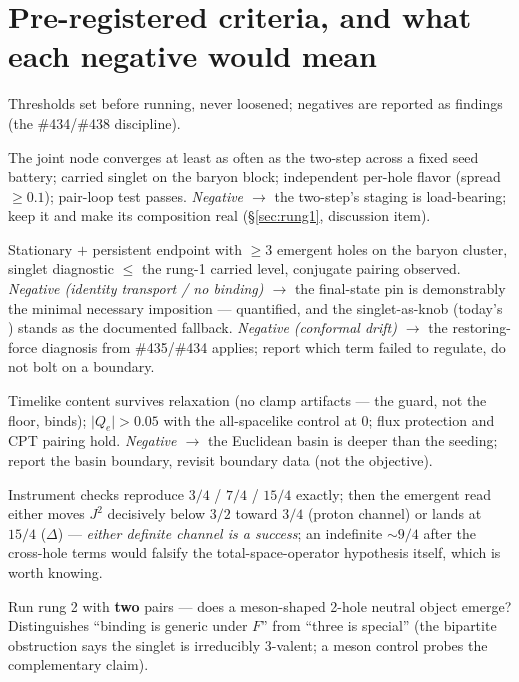 \documentclass[11pt]{article}
\newcommand{\abs}[1]{\lvert #1 \rvert}
\begin{document}
\section{Pre-registered criteria, and what each negative would mean}
\label{sec:criteria}

Thresholds set before running, never loosened; negatives are reported as findings (the
\#434/\#438 discipline).

\begin{description}[leftmargin=2em]
  \item[Rung 1.] The joint node converges at least as often as the two-step across a
    fixed seed battery; carried singlet on the baryon block; independent per-hole flavor
    (spread $\geq 0.1$); pair-loop test passes. \emph{Negative $\to$} the two-step's
    staging is load-bearing; keep it and make its composition real
    (\S\ref{sec:rung1}, discussion item).
  \item[Rung 2.] Stationary $+$ persistent endpoint with $\geq 3$ emergent holes on the
    baryon cluster, singlet diagnostic $\leq$ the rung-1 carried level, conjugate pairing
    observed. \emph{Negative (identity transport / no binding) $\to$} the final-state pin
    is demonstrably the minimal necessary imposition --- quantified, and the
    singlet-as-knob (today's ) stands as the documented fallback.
    \emph{Negative (conformal drift) $\to$} the restoring-force diagnosis from
    \#435/\#434 applies; report which term failed to regulate, do not bolt on a boundary.
  \item[Rung L.] Timelike content survives relaxation (no clamp artifacts --- the guard,
    not the floor, binds); $\abs{Q_e} > 0.05$ with the all-spacelike control at $0$;
    flux protection and CPT pairing hold. \emph{Negative $\to$} the Euclidean basin is
    deeper than the seeding; report the basin boundary, revisit boundary data (not the
    objective).
  \item[Rung R.] Instrument checks reproduce $3/4$ / $7/4$ / $15/4$ exactly; then the
    emergent read either moves $J^2$ decisively below $3/2$ toward $3/4$ (proton
    channel) or lands at $15/4$ ($\Delta$) --- \emph{either definite channel is a
    success}; an indefinite ${\sim}9/4$ after the cross-hole terms would falsify the
    total-space-operator hypothesis itself, which is worth knowing.
  \item[Control (suggested).] Run rung 2 with \textbf{two} pairs --- does a meson-shaped
    2-hole neutral object emerge? Distinguishes ``binding is generic under $F$'' from
    ``three is special'' (the bipartite obstruction says the singlet is irreducibly
    3-valent; a meson control probes the complementary claim).
\end{description}
\end{document}
